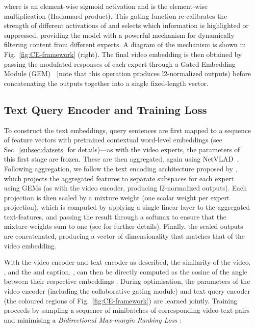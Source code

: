 \documentclass{bmvc2k}
\begin{document}
where  is an element-wise sigmoid activation and  is the element-wise multiplication (Hadamard product). This gating function re-calibrates the strength of different activations of  and selects which information is highlighted or suppressed, providing the model with a powerful mechanism for dynamically filtering content from different experts.  A diagram of the mechanism is shown in Fig.~\ref{fig:CE-framework} (right).  The final video embedding is then obtained by passing the modulated responses of each expert through a Gated Embedding Module (GEM)~\cite{miech2018learning} (note that this operation produces l2-normalized outputs) before concatenating the outputs together into a single fixed-length vector. 
  

\subsection{Text Query Encoder and Training Loss} \label{subsec:text-encoder}

 To construct the text embeddings, query sentences are first mapped to a sequence of feature vectors with pretrained contextual word-level embeddings (see Sec.~\ref{subsec:datsets} for details)---as with the video experts, the parameters of this first stage are frozen.  These are then aggregated, again using NetVLAD~\cite{arandjelovic2016netvlad}.  Following aggregation, we follow the text encoding architecture proposed by \cite{miech2018learning}, which projects the aggregated features to separate subspaces for each expert using GEMs (as with the video encoder, producing l2-normalized outputs).  Each projection is then scaled by a mixture weight (one scalar weight per expert projection), which is computed by applying a single linear layer to the aggregated text-features, and passing the result through a softmax to ensure that the mixture weights sum to one (see \cite{miech2018learning} for further details). Finally, the scaled outputs are concatenated, producing a vector of dimensionality that matches that of the video embedding. 

With the video encoder  and text encoder  as described, the similarity  of the  video, , and the and  caption, , can then be directly computed as the cosine of the angle between their respective embeddings .  During optimisation, the parameters of the video encoder (including the collaborative gating module) and text query encoder (the coloured regions of Fig.~\ref{fig:CE-framework}) are learned jointly.  Training proceeds by sampling a sequence of minibatches of corresponding video-text pairs  and minimising a \textit{Bidirectional Max-margin Ranking Loss} \cite{socher2014grounded}:
\end{document}
